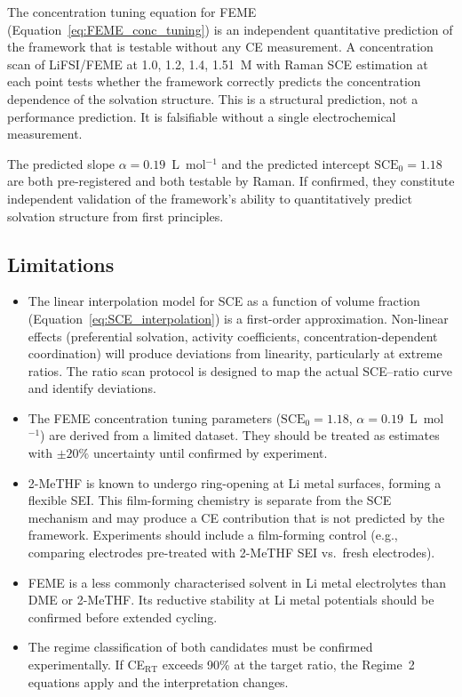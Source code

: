\documentclass[11pt]{article}
\theoremstyle{plain}
\theoremstyle{definition}
\theoremstyle{remark}
\begin{document}
The concentration tuning equation for FEME (Equation~\ref{eq:FEME_conc_tuning})
is an independent quantitative prediction of the framework that is
testable without any CE measurement.  A concentration scan of
LiFSI/FEME at 1.0, 1.2, 1.4, 1.51~M with Raman SCE estimation
at each point tests whether the framework correctly predicts the
concentration dependence of the solvation structure.  This is a
structural prediction, not a performance prediction.  It is
falsifiable without a single electrochemical measurement.

The predicted slope $\alpha = 0.19$~L~mol$^{-1}$ and the predicted
intercept $\mathrm{SCE}_0 = 1.18$ are both pre-registered and both
testable by Raman.  If confirmed, they constitute independent
validation of the framework's ability to quantitatively predict
solvation structure from first principles.

\subsection{Limitations}

\begin{itemize}[leftmargin=2em]
  \item The linear interpolation model for SCE as a function of
        volume fraction (Equation~\ref{eq:SCE_interpolation}) is a
        first-order approximation.  Non-linear effects (preferential
        solvation, activity coefficients, concentration-dependent
        coordination) will produce deviations from linearity,
        particularly at extreme ratios.  The ratio scan protocol
        is designed to map the actual SCE--ratio curve and identify
        deviations.
  \item The FEME concentration tuning parameters
        ($\mathrm{SCE}_0 = 1.18$, $\alpha = 0.19$~L~mol$^{-1}$)
        are derived from a limited dataset.  They should be treated
        as estimates with $\pm 20\%$ uncertainty until confirmed
        by experiment.
  \item 2-MeTHF is known to undergo ring-opening at Li metal
        surfaces, forming a flexible SEI.  This film-forming
        chemistry is separate from the SCE mechanism and may
        produce a CE contribution that is not predicted by the
        framework.  Experiments should include a film-forming
        control (e.g., comparing electrodes pre-treated with
        2-MeTHF SEI vs.\ fresh electrodes).
  \item FEME is a less commonly characterised solvent in Li metal
        electrolytes than DME or 2-MeTHF.  Its reductive stability
        at Li metal potentials should be confirmed before extended
        cycling.
  \item The regime classification of both candidates must be
        confirmed experimentally.  If CE$_\mathrm{RT}$ exceeds
        90\% at the target ratio, the Regime~2 equations apply
        and the interpretation changes.
\end{itemize}
\end{document}
